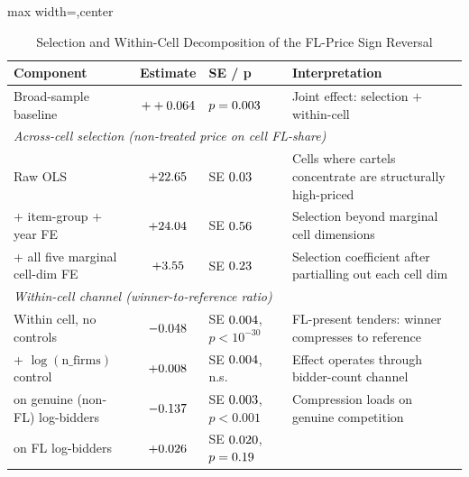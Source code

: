 \begin{table}[htbp]
\centering
\caption{Selection and Within-Cell Decomposition of the FL-Price Sign Reversal}
\label{tab:sign_reversal_decomposition_submission}
\footnotesize
\begin{adjustbox}{max width=\textwidth,center}
\begin{threeparttable}
\begin{tabular}{p{4.8cm}cp{2.0cm}p{5.6cm}}
\toprule
Component & Estimate & SE / p & Interpretation \\
\midrule
Broad-sample baseline & $++0.064$ & $p=0.003$ &
  Joint effect: selection $+$ within-cell \\
\midrule
\multicolumn{4}{l}{\textit{Across-cell selection (non-treated price on cell FL-share)}} \\
\hspace{6pt} Raw OLS & $+22.65$ & SE $0.03$ &
  Cells where cartels concentrate are structurally high-priced \\
\hspace{6pt} + item-group + year FE & $+24.04$ & SE $0.56$ &
  Selection beyond marginal cell dimensions \\
\hspace{6pt} + all five marginal cell-dim FE & $+3.55$ &
  SE $0.23$ &
  Selection coefficient after partialling out each cell dim \\
\midrule
\multicolumn{4}{l}{\textit{Within-cell channel (winner-to-reference ratio)}} \\
\hspace{6pt} Within cell, no controls & $-0.048$ &
  SE $0.004$, $p<10^{-30}$ &
  FL-present tenders: winner compresses to reference \\
\hspace{6pt} + $\log(\text{n\_firms})$ control & $+0.008$ &
  SE $0.004$, n.s. &
  Effect operates through bidder-count channel \\
\hspace{6pt} \hspace{6pt} on genuine (non-FL) log-bidders & $-0.137$ &
  SE $0.003$, $p<0.001$ &
  Compression loads on genuine competition \\
\hspace{6pt} \hspace{6pt} on FL log-bidders & $+0.026$ &
  SE $0.020$, $p=0.19$ &

\end{tabular}
\end{threeparttable}
\end{adjustbox}
\end{table}
